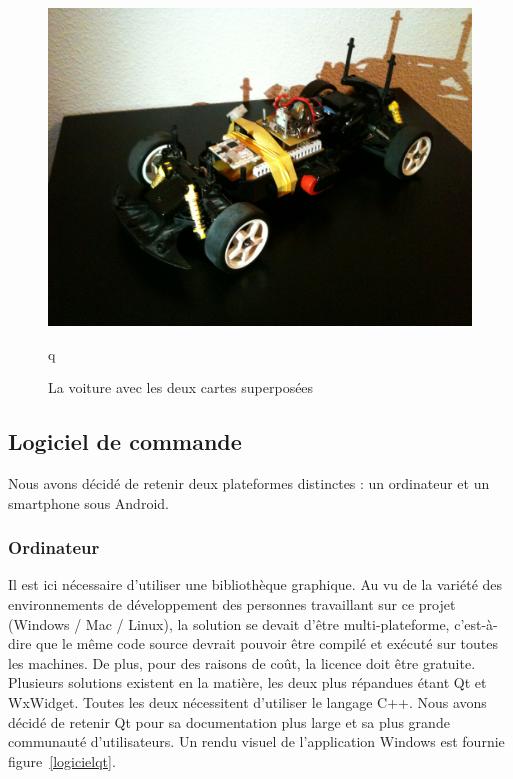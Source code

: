 \documentclass[a4paper,12pt]{report}
\begin{document}
\begin{figure}[!h]
	\begin{center}
		\includegraphics[scale=0.22]{images/voiture.jpg}
	\end{center}
	\caption{La voiture avec les deux cartes superposées} 
	\label{voiture}q
\end{figure}
		
		\subsection{Logiciel de commande	}
		Nous avons décidé de retenir deux plateformes distinctes : un ordinateur et un smartphone sous Android.
		
			\subsubsection{Ordinateur}
			Il est ici nécessaire d’utiliser une bibliothèque graphique. Au vu de la variété des environnements de développement des personnes travaillant sur ce projet (Windows / Mac / Linux), la solution se devait d’être multi-plateforme, c’est-à-dire que le même code source devrait pouvoir être compilé et exécuté sur toutes les machines. De plus, pour des raisons de coût, la licence doit être gratuite. Plusieurs solutions existent en la matière, les deux plus répandues étant Qt et WxWidget. Toutes les deux nécessitent d’utiliser le langage C++. Nous avons décidé de retenir Qt pour sa documentation plus large et sa plus grande communauté d’utilisateurs.
Un rendu visuel de l’application Windows est fournie figure~\ref{logicielqt}. %
\end{document}

